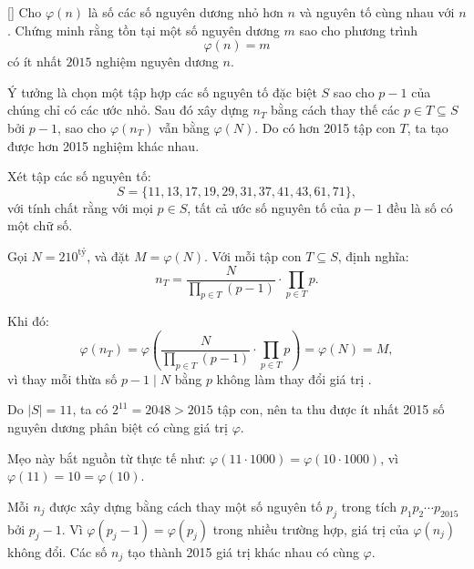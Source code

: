 \documentclass[../09-contruction-methods.tex]{subfiles}
\begin{document}
\begin{example*}\label{example:USA-2015-TSTST-P5}[\textbf{}]
    Cho \( \varphi(n) \) là số các số nguyên dương nhỏ hơn \( n \) và nguyên tố cùng nhau với \( n \).  
    Chứng minh rằng tồn tại một số nguyên dương \( m \) sao cho phương trình
    \[
    	\varphi(n) = m
    \]
    có ít nhất \( 2015 \) nghiệm nguyên dương \( n \).
\end{example*}

\begin{story*}
    Ý tưởng là chọn một tập hợp các số nguyên tố đặc biệt \( S \) sao cho \( p - 1 \) của chúng chỉ có các ước nhỏ. Sau đó xây dựng \( n_T \) bằng cách thay thế các \( p \in T \subseteq S \) bởi \( p - 1 \), sao cho \( \varphi(n_T) \) vẫn bằng \( \varphi(N) \). Do có hơn 2015 tập con \( T \), ta tạo được hơn 2015 nghiệm khác nhau.
\end{story*}

\begin{soln}\footnotemark
    Xét tập các số nguyên tố:
    \[
    	S = \{ 11, 13, 17, 19, 29, 31, 37, 41, 43, 61, 71 \},
    \]
    với tính chất rằng với mọi \( p \in S \), tất cả ước số nguyên tố của \( p - 1 \) đều là số có một chữ số.
    
    Gọi \( N = 210^{\text{tỷ}} \), và đặt \( M = \varphi(N) \).
    Với mỗi tập con \( T \subseteq S \), định nghĩa:
    \[
    	n_T = \frac{N}{\prod_{p \in T}(p-1)} \cdot \prod_{p \in T} p.
    \]
    
    Khi đó:
    \[
    	\varphi(n_T) = \varphi\left(\frac{N}{\prod_{p \in T}(p-1)} \cdot \prod_{p \in T} p\right) = \varphi(N) = M,
    \]
    vì thay mỗi thừa số \( p-1 \mid N \) bằng \( p \) không làm thay đổi giá trị .
    
    Do \( |S| = 11 \), ta có \( 2^{11} = 2048 > 2015 \) tập con, nên ta thu được ít nhất 2015 số nguyên dương phân biệt có cùng giá trị \( \varphi \).
\end{soln}


\begin{remark*}
    Mẹo này bắt nguồn từ thực tế như:  
    \( \varphi(11 \cdot 1000) = \varphi(10 \cdot 1000) \), vì \( \varphi(11) = 10 = \varphi(10) \).
\end{remark*}

\begin{story*}
    Mỗi \( n_j \) được xây dựng bằng cách thay một số nguyên tố \( p_j \) trong tích \( p_1p_2\cdots p_{2015} \) bởi \( p_j - 1 \). Vì \( \varphi(p_j - 1) = \varphi(p_j) \) trong nhiều trường hợp, giá trị của \( \varphi(n_j) \) không đổi. Các số \( n_j \) tạo thành 2015 giá trị khác nhau có cùng \( \varphi \).
\end{story*}
\end{document}
